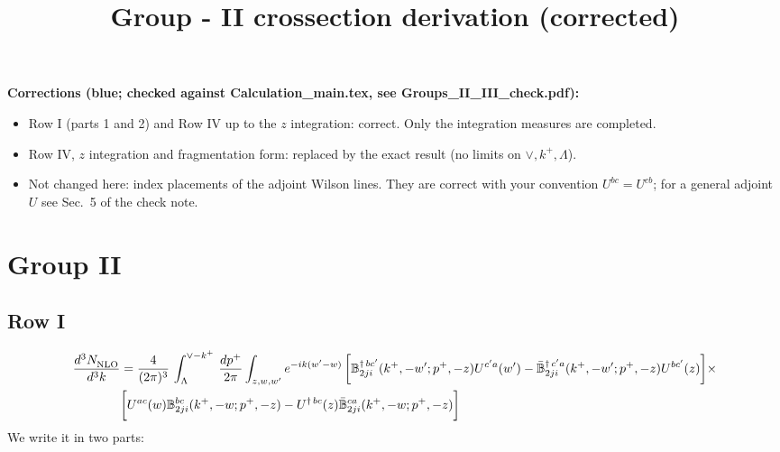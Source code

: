 \documentclass[9pt]{article}
\title{Group - II crossection derivation {\color{blue}(corrected)}}
\author{}
\date{}
\def\mf#1{\mathbb{#1}}
\numberwithin{equation}{section}
\begin{document}
\maketitle
{\color{blue}\noindent\textbf{Corrections (blue; checked against Calculation\_main.tex, see Groups\_II\_III\_check.pdf):}
\begin{itemize}
\item Row I (parts 1 and 2) and Row IV up to the $z$ integration: correct. Only the integration measures are completed.
\item Row IV, $z$ integration and fragmentation form: replaced by the exact result (no limits on $\vee,k^+,\Lambda$).
\item Not changed here: index placements of the adjoint Wilson lines. They are correct with your convention $U^{bc}=U^{cb}$; for a general adjoint $U$ see Sec.~5 of the check note.
\end{itemize}}
\section{Group II}
\subsection{Row I\,}
\begin{align}
    \frac{d^{3}N_{\rm NLO}^{\rm}}{d^{3}k}  & = \frac{4}{(2\pi)^{3}}\,\int_{\Lambda}^{\vee-k^{+}}\, \frac{dp^{+}}{2\pi}\int_{z,w,w^{\prime}} e^{-ik(w^{\prime}-w)}\, \bigg[\mf{B}^{\dagger\, bc^{\prime}}_{2ji}(k^{+},-w^{\prime};p^{+},-z)U^{ c^{\prime}a}(w^{\prime}) -\Bar{\mf{B}}^{\dagger\, c^{\prime}a}_{2ji}(k^{+},-w^{\prime}; p^{+},-z)U^{bc^{\prime}}(z)\bigg]\times\notag \\ & \bigg[U^{ac}(w) \mf{B}^{bc}_{2ji}(k^{+},-w;p^{+},-z) -U^{\dagger\, bc}(z)\Bar{\mf{B}}^{ca}_{2ji}(k^{+},-w; p^{+},-z)\bigg]\nonumber
\end{align}
We write it in two parts: 
\end{document}
